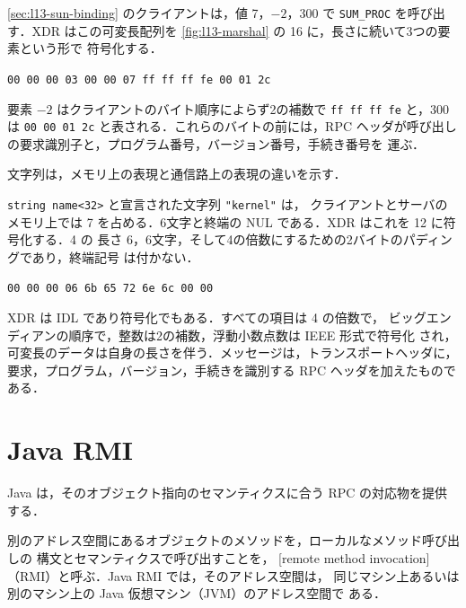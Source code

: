 \documentclass[../main.tex]{subfiles}
\begin{document}
\begin{example}
  \label{ex:l13-encoding}
  \cref{sec:l13-sun-binding} のクライアントは，値 7，$-2$，300 で
  \texttt{SUM\_PROC} を呼び出す．XDR はこの可変長配列を
  \cref{fig:l13-marshal} の \SI{16}{\byte} に，長さに続いて3つの要素という形で
  符号化する．
  \begin{center}
    \texttt{00 00 00 03  00 00 07 \quad ff ff ff fe  00 01 2c}
  \end{center}
  要素 $-2$ はクライアントのバイト順序によらず2の補数で \texttt{ff ff ff fe}
  と，300 は \texttt{00 00 01 2c} と表される．これらのバイトの前には，RPC
  ヘッダが呼び出しの要求識別子と，プログラム番号，バージョン番号，手続き番号を
  運ぶ．
\end{example}

文字列は，メモリ上の表現と通信路上の表現の違いを示す．

\begin{example}
  \label{ex:l13-string}
  \texttt{string name<32>} と宣言された文字列 \texttt{"kernel"} は，
  クライアントとサーバのメモリ上では \SI{7}{\byte} を占める．6文字と終端の
  NUL である．XDR はこれを \SI{12}{\byte} に符号化する．\SI{4}{\byte} の
  長さ 6，6文字，そして4の倍数にするための2バイトのパディングであり，終端記号
  は付かない．
  \begin{center}
    \texttt{00 00 00 06 \quad 6b 65 72 6e  6c 00 00}
  \end{center}
\end{example}

\begin{keypoint}
  XDR は IDL であり符号化でもある．すべての項目は \SI{4}{\byte} の倍数で，
  ビッグエンディアンの順序で，整数は2の補数，浮動小数点数は IEEE 形式で符号化
  され，可変長のデータは自身の長さを伴う．メッセージは，トランスポートヘッダに，
  要求，プログラム，バージョン，手続きを識別する RPC ヘッダを加えたものである．
\end{keypoint}

\section{Java RMI}
\label{sec:l13-rmi}

Java は，そのオブジェクト指向のセマンティクスに合う RPC の対応物を提供する．

\begin{definition}[リモートメソッド呼び出し]
  別のアドレス空間にあるオブジェクトのメソッドを，ローカルなメソッド呼び出しの
  構文とセマンティクスで呼び出すことを，
  [remote method invocation]（RMI）と呼ぶ．Java RMI では，そのアドレス空間は，
  同じマシン上あるいは別のマシン上の Java 仮想マシン（JVM）のアドレス空間で
  ある．
\end{definition}
%
\end{document}
